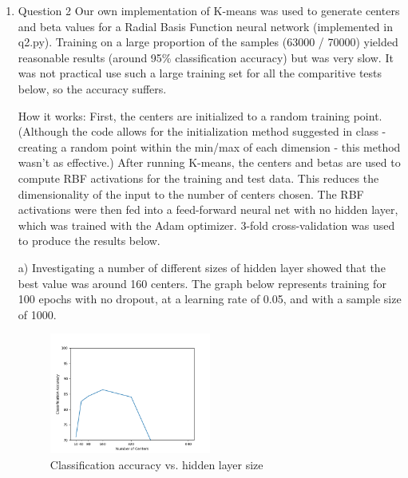 \documentclass[11pt]{article}
\begin{document}
\begin{enumerate}
\item Question 2
Our own implementation of K-means was used to generate centers and beta values for a Radial Basis Function neural network (implemented in q2.py). Training on a large proportion of the samples (63000 / 70000) yielded reasonable results (around 95\% classification accuracy) but was very slow. It was not practical use such a large training set for all the comparitive tests below, so the accuracy suffers.

How it works: First, the centers are initialized to a random training point. (Although the code allows for the initialization method suggested in class - creating a random point within the min/max of each dimension - this method wasn't as effective.) After running K-means, the centers and betas are used to compute RBF activations for the training and test data. This reduces the dimensionality of the input to the number of centers chosen. The RBF activations were then fed into a feed-forward neural net with no hidden layer, which was trained with the Adam optimizer. 3-fold cross-validation was used to produce the results below.
    
a) Investigating a number of different sizes of hidden layer showed that the best value was around 160 centers. The graph below represents training for 100 epochs with no dropout, at a learning rate of 0.05, and with a sample size of 1000.
\begin{figure}[h!]
    \centering
     \includegraphics[width=0.5\textwidth]{q2_centers}
        \caption{Classification accuracy vs. hidden layer size}
\end{figure}



\end{enumerate}
\end{document}
